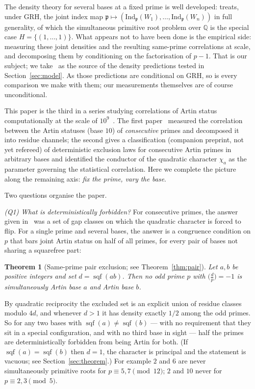 \documentclass[11pt,reqno]{amsart}
\theoremstyle{plain}
\newtheorem{theorem}{Theorem}
\theoremstyle{definition}
\DeclareMathOperator{\sqf}{sqf}
\newcommand{\Q}{\mathbb{Q}}
\begin{document}
The density theory for several bases at a fixed prime is well developed:
\cite{JarviniemiPeruccaSgobba2025} treats, under GRH, the joint index map
$\mathfrak{p} \mapsto (\mathrm{Ind}_{\mathfrak{p}}(W_1), \ldots,
\mathrm{Ind}_{\mathfrak{p}}(W_n))$ in full generality, of which the
simultaneous primitive root problem over $\Q$ is the special case
$H = \{(1,\ldots,1)\}$. What appears not to have been done is the empirical
side: measuring these joint densities and the resulting same-prime
correlations at scale, and decomposing them by conditioning on the
factorisation of $p-1$. That is our subject; we
take~\cite{Matthews1976, MoreeStevenhagen2014} as the source of the density
predictions tested in Section~\ref{sec:model}. As those predictions are
conditional on GRH, so is every comparison we make with them; our measurements
themselves are of course unconditional.

This paper is the third in a series studying correlations of Artin status
computationally at the scale of $10^9$~\cite{BaldI, BaldII}. The first
paper~\cite{BaldI} measured the correlation between the Artin statuses (base $10$) of
\emph{consecutive} primes and decomposed it into residue channels; the second
gives a classification (companion preprint, not yet refereed) of deterministic exclusion laws for consecutive Artin
primes in arbitrary bases and identified the conductor of the quadratic
character $\chi_a$ as the parameter governing the statistical correlation.
Here we complete the picture along the remaining axis: \emph{fix the prime,
vary the base}.

Two questions organise the paper.

\emph{(Q1) What is deterministically forbidden?} For consecutive primes, the
answer given in~\cite{BaldII} was a set of gap classes on which the
quadratic character is forced to flip. For a single prime and several bases,
the answer is a congruence condition on $p$ that bars joint Artin status on
half of all primes, for every pair of bases not sharing a squarefree part:

\begin{theorem}[Same-prime pair exclusion; see Theorem~\ref{thm:pair}]
Let $a, b$ be positive integers and set $d = \sqf(ab)$. Then no odd prime $p$
with $\bigl(\tfrac{d}{p}\bigr) = -1$ is simultaneously Artin base $a$ and
Artin base $b$.
\end{theorem}

By quadratic reciprocity the excluded set is an explicit union of residue
classes modulo $4d$, and whenever $d > 1$ it has density exactly $1/2$ among
the odd primes. So for any two bases with $\sqf(a) \ne \sqf(b)$ --- with no
requirement that they sit in a special configuration, and with no third base in
sight --- half the primes are deterministically forbidden from being Artin for
both. (If $\sqf(a) = \sqf(b)$ then $d = 1$, the character is principal and the
statement is vacuous; see Section~\ref{sec:theorem}.) For example $2$ and $6$
are never simultaneously primitive roots for $p \equiv 5, 7 \pmod{12}$; $2$
and $10$ never for $p \equiv 2, 3 \pmod 5$.
\end{document}
